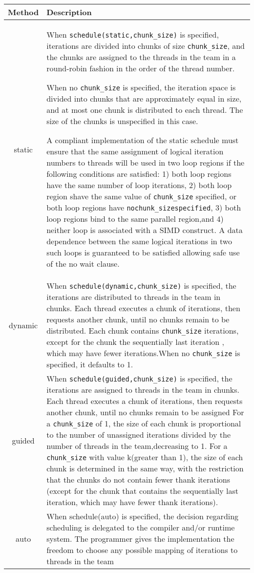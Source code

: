\documentclass[paper=letter, fontsize=12pt]{article}
\begin{document}
\begin{table}[!htbp]
    \centering
    \begin{tabular}{c | p{15cm}}
        \textbf{Method} & \textbf{Description}
        \\ \hline \hline
        static & When \verb|schedule(static,chunk_size)| is specified, iterations are divided into chunks of size \verb|chunk_size|, and the chunks are assigned to the threads in the team in a round-robin fashion in the order of the thread number.
        
        When no \verb|chunk_size| is specified, the iteration space is divided into chunks that are approximately equal in size, and at most one chunk is distributed to each thread. The size of the chunks is unspecified in this case.
        
        A compliant implementation of the static schedule must ensure that the same assignment of logical iteration numbers to threads will be used in two loop regions if the following conditions are satisfied: 1) both loop regions have the same number of loop iterations, 2) both loop region shave the same value of \verb|chunk_size| specified, or both loop regions have \verb|nochunk_sizespecified|, 3) both loop regions bind to the same parallel region,and 4) neither loop is associated with a SIMD construct. A data dependence between the same logical iterations in two such loops is guaranteed to be satisfied allowing safe use of the no wait clause.
        \\ \hline
        dynamic & When \verb|schedule(dynamic,chunk_size)| is specified, the iterations are distributed to threads in the team in chunks. Each thread executes a chunk of iterations, then requests another chunk, until no chunks remain to be distributed.
        Each chunk contains \verb|chunk_size| iterations, except for the chunk the sequentially last iteration
        , which may have fewer iterations.When no \verb|chunk_size| is specified, it defaults to 1.
        \\ \hline
        guided & When \verb|schedule(guided,chunk_size)| is specified, the iterations are assigned to threads in the team in chunks. Each thread executes a chunk of iterations, then requests another chunk, until no chunks remain to be assigned
        For a \verb|chunk_size| of 1, the size of each chunk is proportional to the number of unassigned iterations divided by the number of threads in the team,decreasing to 1. For a \verb|chunk_size| with value k(greater than 1), the size of each chunk is determined in the same way, with the restriction that the chunks do not contain fewer thank iterations (except for the chunk that contains the sequentially last iteration, which may have fewer thank iterations).
        \\ \hline
        auto & When schedule(auto) is specified, the decision regarding scheduling is delegated to the compiler and/or runtime system. The programmer gives the implementation the freedom to choose any possible mapping of iterations to threads in the team
    \end{tabular}
\end{table}
\end{document}
